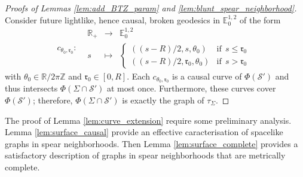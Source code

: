 \documentclass[a4paper,12pt]{article}
\def\r{\mathfrak{r}}
\def\Z{\mathbb{Z}}
\def\R{\mathbb{R}}
\def\S{\mathcal S}
\def\S{\mathcal{S}}
\def\RR{\mathbb{R}}
\newcommand{\mass}[1]{{\mathbb E}^{1,2}_{#1}}
\newcommand{\fonction}[5]{\displaystyle#1:\begin{array}{l|rcl}
& \displaystyle #2 & \longrightarrow & \displaystyle #3 \\
    & \displaystyle #4 & \longmapsto & \displaystyle #5 \end{array}}
\begin{document}
\begin{proof}[Proofs of Lemmas  \ref{lem:add_BTZ_param} and \ref{lem:blunt_spear_neighborhood}]
      Consider future lightlike, hence causal, broken geodesics in $\mass{0}$ of the form 
      $$\fonction
      {c_{\theta_0,\r_0}}{
      \RR_+}
      {\mass{0}}{s}{\left\{\begin{array}{ll}\displaystyle ((s-R)/2,s,\theta_0) & \text{if}~~ s\leq \r_0\\ \displaystyle ((s-R)/2,\r_0,\theta_0) & \text{if}~~s> \r_0  \end{array} \right.}$$
      with $\theta_0 \in \R/2\pi\Z$ and $\r_0\in [0,R]$.
     Each $c_{\theta_0,\r_0}$ is a causal curve of $\Phi(\S')$ and thus intersects $\Phi(\Sigma\cap\S')$ at most once. Furthermore, these curves cover $\Phi(\S')$; therefore, $\Phi(\Sigma\cap\S')$ is exactly the graph of $\tau_\Sigma$.
     


    \end{proof}
 

    
   The proof of Lemma \ref{lem:curve_extension} require some preliminary  analysis. Lemma \ref{lem:surface_causal}  provide an effective caracterisation of spacelike graphs in spear neighborhoods. Then Lemma \ref{lem:surface_complete} provides a satisfactory description of graphs in spear neighborhoods that are metrically complete.
    
\end{document}
